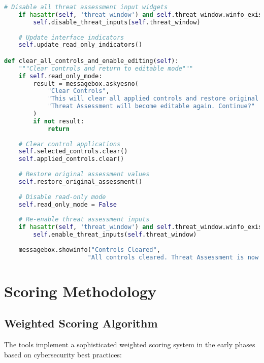 \documentclass[binding=0.6cm]{sapthesis}
\begin{document}
\begin{lstlisting}[language=Python, caption=Assessment Protection Implementation]
    # Disable all threat assessment input widgets
    if hasattr(self, 'threat_window') and self.threat_window.winfo_exists():
        self.disable_threat_inputs(self.threat_window)
    
    # Update interface indicators
    self.update_read_only_indicators()

def clear_all_controls_and_enable_editing(self):
    """Clear controls and return to editable mode"""
    if self.read_only_mode:
        result = messagebox.askyesno(
            "Clear Controls", 
            "This will clear all applied controls and restore original assessment values.\n"
            "Threat Assessment will become editable again. Continue?"
        )
        if not result:
            return
    
    # Clear control applications
    self.selected_controls.clear()
    self.applied_controls.clear()
    
    # Restore original assessment values
    self.restore_original_assessment()
    
    # Disable read-only mode
    self.read_only_mode = False
    
    # Re-enable threat assessment inputs
    if hasattr(self, 'threat_window') and self.threat_window.winfo_exists():
        self.enable_threat_inputs(self.threat_window)
    
    messagebox.showinfo("Controls Cleared", 
                       "All controls cleared. Threat Assessment is now editable.")
\end{lstlisting}

\section{Scoring Methodology}

\subsection{Weighted Scoring Algorithm}

The tools implement a sophisticated weighted scoring system in the early phases based on cybersecurity best practices:
\end{document}
